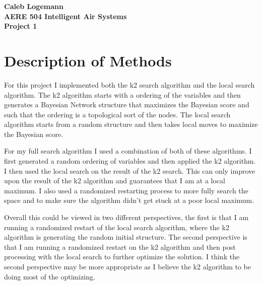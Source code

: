 \documentclass[12pt, oneside]{article}
\begin{document}
\noindent \textbf{\Large{Caleb Logemann \\
AERE 504 Intelligent Air Systems \\
Project 1
}}

\section{Description of Methods}
  For this project I implemented both the k2 search algorithm and the local
  search algorithm.
  The k2 algorithm starts with a ordering of the variables and then generates
  a Bayesian Network structure that maximizes the Bayesian score and such that
  the ordering is a topological sort of the nodes.
  The local search algorithm starts from a random structure and then takes
  local moves to maximize the Bayesian score.

  For my full search algorithm I used a combination of both of these algorithms.
  I first generated a random ordering of variables and then applied the k2 algorithm.
  I then used the local search on the result of the k2 search.
  This can only improve upon the result of the k2 algorithm and guarantees that
  I am at a local maximum.
  I also used a randomized restarting process to more fully search the space
  and to make sure the algorithm didn't get stuck at a poor local maximum.

  Overall this could be viewed in two different perspectives, the first is that
  I am running a randomized restart of the local search algorithm, where the k2
  algorithm is generating the random initial structure.
  The second perspective is that I am running a randomized restart on the k2
  algorithm and then post processing with the local search to further optimize
  the solution.
  I think the second perspective may be more appropriate as I believe the k2
  algorithm to be doing most of the optimizing.
\end{document}
